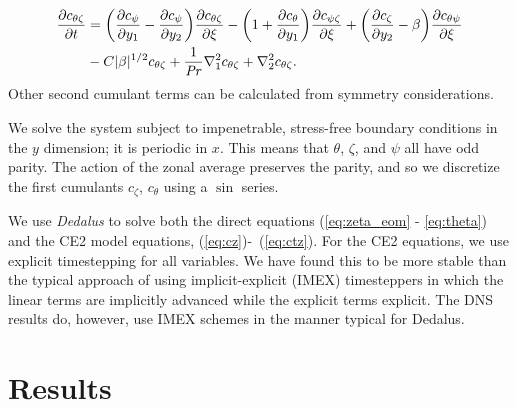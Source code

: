\documentclass{jfm}
\newcommand{\cz}{c_{\zeta}}
\newcommand{\cs}{c_{\psi}}
\newcommand{\ct}{c_{\theta}}
\newcommand{\csz}{c_{\psi \zeta}}
\newcommand{\ctz}{c_{\theta \zeta}}
\newcommand{\czt}{c_{\zeta \theta}}
\newcommand{\cts}{c_{\theta \psi}}
\begin{document}
\begin{equation}
  \label{eq:ctz}
  \begin{split}
    \pdv{\ctz}{t} &= \qty(\pdv{\cs}{y_1} - \pdv{\cs}{y_2}) \pdv{\ctz}{\xi} - \qty(1 + \pdv{\ct}{y_1}) \pdv{\csz}{\xi} + \qty(\pdv{\cz}{y_2} - \beta) \pdv{\cts}{\xi}\\
    &  - C |\beta|^{1/2} \ctz + \frac{1}{\Pran} \nabla_1^2 \ctz + \nabla_2^2 \ctz.
  \end{split}
\end{equation}
Other second cumulant terms can be calculated from symmetry considerations.



We solve the system subject to impenetrable, stress-free boundary conditions in the $y$ dimension; it is periodic in $x$. 
This means that $\theta$, $\zeta$, and $\psi$ all have odd parity.
The action of the zonal average preserves the parity, and so we discretize the first cumulants $\cz$, $\ct$ using a $\sin$ series. 


We use \emph{Dedalus} \citep{2020PhRvR...2b3068B} to solve both the direct equations (\ref{eq:zeta_eom} - \ref{eq:theta}) and the CE2 model equations, (\ref{eq:cz})-~(\ref{eq:ctz}).
For the CE2 equations, we use explicit timestepping for all variables.
We have found this to be more stable than the typical approach of using implicit-explicit (IMEX) timesteppers in which the linear terms are implicitly advanced while the explicit terms explicit.
The DNS results do, however, use IMEX schemes in the manner typical for Dedalus.


\section{Results}
\label{sec:results}
\end{document}
